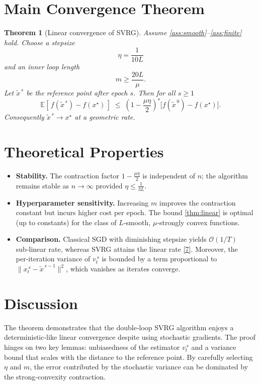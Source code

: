 \documentclass[11pt]{article}
\newtheorem{theorem}{Theorem}[section]
\begin{document}
\section*{Main Convergence Theorem}
\begin{theorem}[Linear convergence of SVRG]\label{thm:linear}
Assume \ref{ass:smooth}–\ref{ass:finite} hold. Choose a stepsize 
\[
\eta = \frac{1}{10L}
\tag{5}
\]
and an inner loop length 
\[
m \ge \frac{20L}{\mu}.
\tag{6}
\]
Let $\tilde{x}^{\,s}$ be the reference point after epoch $s$. Then for all $s\ge 1$
\[
\mathbb{E}\!\left[\,f(\tilde{x}^{\,s})-f(x^\star)\,\right]
\;\le\;
\left(1-\frac{\mu\eta}{2}\right)^{\!s}
\bigl[f(\tilde{x}^{\,0})-f(x^\star)\bigr].
\tag{7}
\]
Consequently $\tilde{x}^{\,s}\to x^\star$ at a geometric rate.
\end{theorem}

\section*{Theoretical Properties}
\begin{itemize}
\item \textbf{Stability.} The contraction factor $1-\frac{\mu\eta}{2}$ is independent of $n$; the algorithm remains stable as $n\to\infty$ provided $\eta\le\frac{1}{3L}$.
\item \textbf{Hyperparameter sensitivity.} Increasing $m$ improves the contraction constant but incurs higher cost per epoch. The bound \eqref{thm:linear} is optimal (up to constants) for the class of $L$‑smooth, $\mu$‑strongly convex functions.
\item \textbf{Comparison.} Classical SGD with diminishing stepsize yields $\mathcal{O}(1/T)$ sub‑linear rate, whereas SVRG attains the linear rate \eqref{7}. Moreover, the per‑iteration variance of $v_t^{\,s}$ is bounded by a term proportional to $\|x_t^{\,s}-\tilde{x}^{\,s-1}\|^2$, which vanishes as iterates converge.
\end{itemize}

\section*{Discussion}
The theorem demonstrates that the double‑loop SVRG algorithm enjoys a deterministic‑like linear convergence despite using stochastic gradients. The proof hinges on two key lemmas: unbiasedness of the estimator $v_t^{\,s}$ and a variance bound that scales with the distance to the reference point. By carefully selecting $\eta$ and $m$, the error contributed by the stochastic variance can be dominated by the strong‑convexity contraction.
\end{document}
